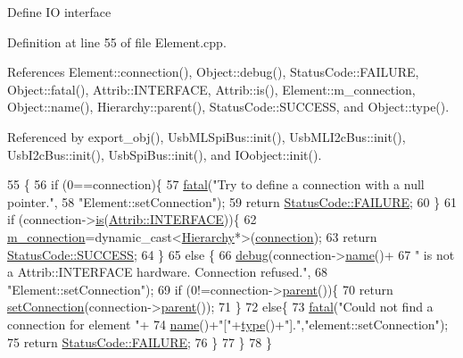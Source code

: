 Define IO interface 

Definition at line 55 of file Element.\+cpp.



References Element\+::connection(), Object\+::debug(), Status\+Code\+::\+F\+A\+I\+L\+U\+RE, Object\+::fatal(), Attrib\+::\+I\+N\+T\+E\+R\+F\+A\+CE, Attrib\+::is(), Element\+::m\+\_\+connection, Object\+::name(), Hierarchy\+::parent(), Status\+Code\+::\+S\+U\+C\+C\+E\+SS, and Object\+::type().



Referenced by export\+\_\+obj(), Usb\+M\+L\+Spi\+Bus\+::init(), Usb\+M\+L\+I2c\+Bus\+::init(), Usb\+I2c\+Bus\+::init(), Usb\+Spi\+Bus\+::init(), and I\+Oobject\+::init().


\begin{DoxyCode}
55                                                       \{
56   \textcolor{keywordflow}{if} (0==connection)\{
57     \hyperlink{classObject_aad5a16aac7516ce65bd5ec02ab07fc80}{fatal}(\textcolor{stringliteral}{"Try to define a connection with a null pointer."},
58         \textcolor{stringliteral}{"Element::setConnection"});
59     \textcolor{keywordflow}{return} \hyperlink{classStatusCode_a6f565cbeadc76d14c72f047e5e85eb4ba3da73d4c469762eb9d3c960368252b26}{StatusCode::FAILURE};
60   \}
61   \textcolor{keywordflow}{if} (connection->\hyperlink{classAttrib_a704f26af560909ad22065083bb7d4c34}{is}(\hyperlink{classAttrib_a69e171d7cc6417835a5a306d3c764235aa27c16b480a369ea4d18b07b2516bbc7}{Attrib::INTERFACE}))\{
62     \hyperlink{classElement_abe3de7a5dbbc9a6dd2d7e012e5fdb266}{m\_connection}=\textcolor{keyword}{dynamic\_cast<}\hyperlink{classHierarchy}{Hierarchy}*\textcolor{keyword}{>}(\hyperlink{classElement_af57444353c1ddf9fa0109801e97debf7}{connection});
63     \textcolor{keywordflow}{return} \hyperlink{classStatusCode_a6f565cbeadc76d14c72f047e5e85eb4badd0da38d3ba0d922efd1f4619bc37ad8}{StatusCode::SUCCESS};
64   \}
65   \textcolor{keywordflow}{else} \{
66     \hyperlink{classObject_aac010553f022165573714b7014a15f0d}{debug}(connection->\hyperlink{classObject_a300f4c05dd468c7bb8b3c968868443c1}{name}()+
67         \textcolor{stringliteral}{" is not a Attrib::INTERFACE hardware. Connection refused."},
68         \textcolor{stringliteral}{"Element::setConnection"});
69     \textcolor{keywordflow}{if} (0!=connection->\hyperlink{classHierarchy_a1c7bec8257e717f9c1465e06ebf845fc}{parent}())\{
70       \textcolor{keywordflow}{return} \hyperlink{classElement_ab476b4b1df5954141ceb14f072433b89}{setConnection}(connection->\hyperlink{classHierarchy_a1c7bec8257e717f9c1465e06ebf845fc}{parent}());
71     \}
72     \textcolor{keywordflow}{else}\{
73       \hyperlink{classObject_aad5a16aac7516ce65bd5ec02ab07fc80}{fatal}(\textcolor{stringliteral}{"Could not find a connection for element "}+
74           \hyperlink{classObject_a300f4c05dd468c7bb8b3c968868443c1}{name}()+\textcolor{stringliteral}{"["}+\hyperlink{classObject_a84f99f70f144a83e1582d1d0f84e4e62}{type}()+\textcolor{stringliteral}{"]."},\textcolor{stringliteral}{"element::setConnection"});
75       \textcolor{keywordflow}{return} \hyperlink{classStatusCode_a6f565cbeadc76d14c72f047e5e85eb4ba3da73d4c469762eb9d3c960368252b26}{StatusCode::FAILURE};
76     \}
77   \}
78 \}
\end{DoxyCode}
